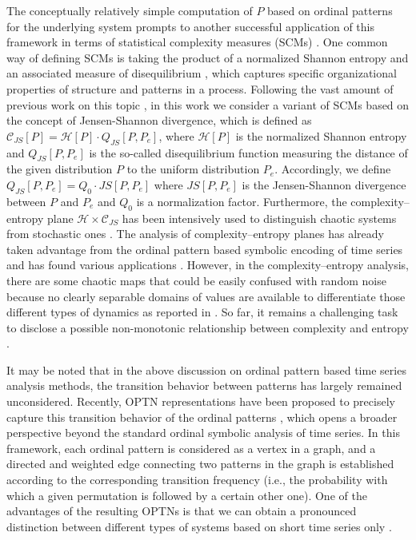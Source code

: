 \documentclass[12pt,aip,cha,reprint,nofootinbib]{revtex4-1}
\begin{document}
The conceptually relatively simple computation of $P$ based on ordinal patterns for the underlying system prompts to another successful application of this framework in terms of statistical complexity measures (SCMs) \cite{kowalskiEntropy2011}. One common way of defining SCMs is taking the product of a normalized Shannon entropy and an associated measure of disequilibrium \cite{LopezPLA1995,kowalskiEntropy2011}, which captures specific organizational properties of structure and patterns in a process. Following the vast amount of previous work on this topic  \cite{rossoPRL2007,LopezPLA1995,kowalskiEntropy2011,Lange2013}, in this work we consider a variant of SCMs based on the concept of Jensen-Shannon divergence, which is defined as $\mathcal{C}_{JS}[P] = \mathcal{H}[P] \cdot  Q_{JS}[P, P_e]$, where $\mathcal{H}[P]$ is the normalized Shannon entropy and $Q_{JS}[P, P_e]$ is the so-called disequilibrium function measuring the distance of the given distribution $P$ to the uniform distribution $P_e$. Accordingly, we define $Q_{JS}[P, P_e] = Q_{0} \cdot JS[P, P_e]$ where $JS[P, P_e]$ is the Jensen-Shannon divergence between $P$ and $P_e$ and $Q_{0}$ is a normalization factor. Furthermore, the complexity--entropy plane $\mathcal{H} \times \mathcal{C}_{JS}$ has been intensively used to distinguish chaotic systems from stochastic ones \cite{rossoPRL2007}. The analysis of complexity--entropy planes has already taken advantage from the ordinal pattern based symbolic encoding of time series and has found various applications \cite{rossoPRL2007,kowalskiEntropy2011}. However, in the complexity--entropy analysis, there are some chaotic maps that could be easily confused with random noise because no clearly separable domains of values are available to differentiate those different types of dynamics as reported in \cite{BorgesAMC2019}. So far, it remains a challenging task to disclose a possible non-monotonic relationship between complexity and entropy \cite{MartinPLA2003}. 

It may be noted that in the above discussion on ordinal pattern based time series analysis methods, the transition behavior between patterns has largely remained unconsidered. Recently, OPTN representations have been proposed to precisely capture this transition behavior of the ordinal patterns \cite{MichaelChaos2015,KulpChaos2016,zhangSciRep2017,McCullough2017b,BorgesAMC2019}, which opens a broader perspective beyond the standard ordinal symbolic analysis of time series. In this framework, each ordinal pattern is considered as a vertex in a graph, and a directed and weighted edge connecting two patterns in the graph is established according to the corresponding transition frequency (i.e., the probability with which a given permutation is followed by a certain other one). One of the advantages of the resulting OPTNs is that we can obtain a pronounced distinction between different types of systems based on short time series only \cite{MichaelChaos2015,BorgesAMC2019}. 
\end{document}
